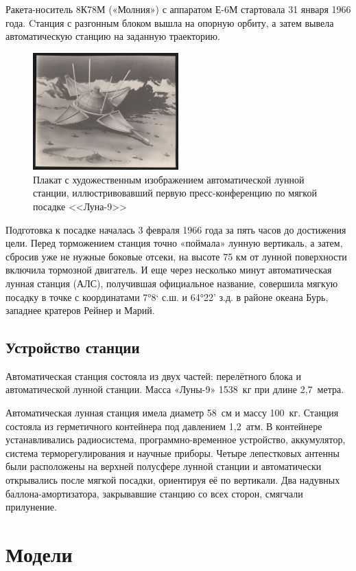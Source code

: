 \noindent Ракета-носитель 8К78М («Молния») с аппаратом Е-6М стартовала 31 января 1966 года. Cтанция с разгонным блоком вышла на опорную орбиту, а затем вывела автоматическую станцию на заданную траекторию.
\begin{figure}
	\includegraphics[width=0.5\textwidth]{4164397702}
	\caption{Плакат с художественным изображением автоматической лунной станции, иллюстривовавший первую пресс-конференцию по мягкой посадке <<Луна-9>>}
\end{figure}
\noindent Подготовка к посадке началась 3 февраля 1966 года за пять часов до достижения цели. Перед торможением станция точно «поймала» лунную вертикаль, а затем, сбросив уже не нужные боковые отсеки, на высоте 75 км от лунной поверхности включила тормозной двигатель. И еще через несколько минут автоматическая лунная станция (АЛС), получившая официальное название, совершила мягкую посадку в точке с координатами 7°8‘ с.ш. и 64°22’ з.д. в районе океана Бурь, западнее кратеров Рейнер и Марий.
\subsection{Устройство станции}
\noindent Автоматическая станция состояла из двух частей: перелётного блока и автоматической лунной станции. Масса «Луны-9» 1538 кг при длине 2,7 метра.

\noindent Автоматическая лунная станция имела диаметр 58 см и массу 100 кг. Станция состояла из герметичного контейнера под давлением 1,2 атм. В контейнере устанавливались радиосистема, программно-временное устройство, аккумулятор, система терморегулирования и научные приборы. Четыре лепестковых антенны были расположены на верхней полусфере лунной станции и автоматически открывались после мягкой посадки, ориентируя её по вертикали. Два надувных баллона-амортизатора, закрывавшие станцию со всех сторон, смягчали прилунение. 
\section{Модели}
